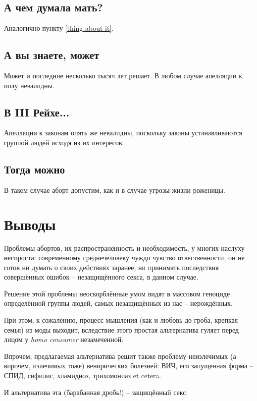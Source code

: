 \documentclass[a4paper,12pt]{report}
\begin{document}
	\section{А чем думала мать?}
        Аналогично пункту \ref{thing-about-it}.
    \section{А вы знаете, может}
        Может и последние несколько тысяч лет решает. В любом случае апелляции к полу невалидны.
    \section{В III Рейхе...}\label{laws}
        Апелляции к законам опять же невалидны, поскольку законы устанавливаются группой 
        людей исходя из их интересов.
	\section{Тогда можно}
        В таком случае аборт допустим, как и в случае угрозы жизни роженицы.


\chapter{Выводы}
Проблемы абортов, их распространённость и необходимость, у многих наслуху неспроста: 
современному среднечеловеку чуждо чувство отвественности, он не готов ни думать о 
своих действиях заранее, ни принимать последствия совершённых ошибок -- незащищённого 
секса, в данном случае.

Решение этой проблемы неоскорблённые умом видят в массовом геноциде определённой 
группы людей, самых незащищённых из нас --  нерождённых. 

При этом, к сожалению, процесс мышления (как и любовь до гроба, крепкая семья) из 
моды выходит, вследствие этого простая альтернатива гуляет перед лицом у \textit{homo consumer} 
незамеченной. 

Впрочем, предлагаемая альтернатива решит также проблему неизлечимых (а впрочем, 
излечимых тоже) венирических болезней: ВИЧ, его запущенная форма -- СПИД, 
сифилис, хламидиоз, трихомониаз et cetera.

И альтернатива эта (барабанная дробь!) -- защищённый секс.
\end{document}

